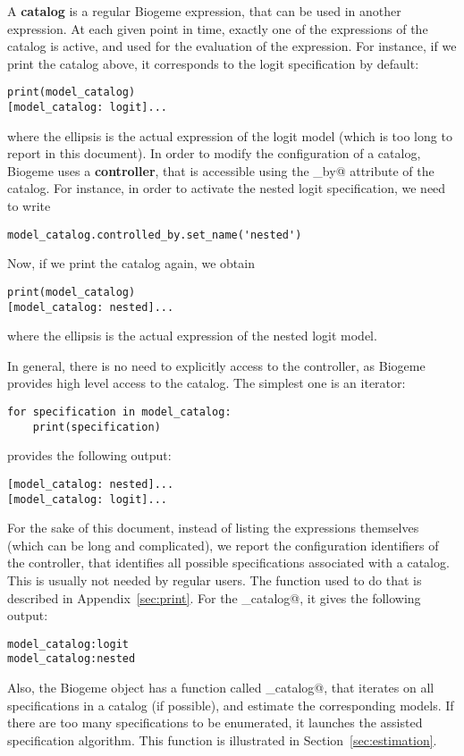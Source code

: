 \documentclass[12pt,a4paper]{article}
\begin{document}
A \textbf{catalog} is a regular Biogeme expression, that can be used
in another expression. At each given point in time, exactly one of the
expressions of the catalog is active, and used for the evaluation of
the expression. For instance, if we print the catalog above, it
corresponds to the logit specification by default:
\begin{lstlisting}
print(model_catalog)
[model_catalog: logit]...
\end{lstlisting}
where the ellipsis is the actual expression of the logit model (which is too long to report in this document). 
In order to modify the configuration of a catalog, Biogeme uses a
\textbf{controller}, that is accessible using the
\lstinline@controlled_by@ attribute of the catalog. For instance, in
order to activate the nested logit specification, we need to write
\begin{lstlisting}
model_catalog.controlled_by.set_name('nested')  
\end{lstlisting}
Now, if we print the catalog again, we obtain
\begin{lstlisting}
print(model_catalog)
[model_catalog: nested]...
\end{lstlisting}
where the ellipsis is the actual expression of the nested logit model. 

In general, there is no need to explicitly access to the controller,
as Biogeme provides high level access to the catalog. The simplest one
is an iterator:
\begin{lstlisting}
for specification in model_catalog:
    print(specification)
\end{lstlisting}
provides the following output:
\begin{lstlisting}
[model_catalog: nested]...
[model_catalog: logit]...
\end{lstlisting}
For the sake of this document, instead of listing the expressions themselves (which can be long and complicated), we report the configuration identifiers of the controller, that identifies all possible specifications associated with a catalog. This is usually not needed by regular users. The function used to do that is described in Appendix~\ref{sec:print}.
For the \lstinline@model_catalog@, it gives the following output:
\begin{lstlisting}
model_catalog:logit
model_catalog:nested
\end{lstlisting}
Also, the Biogeme object has a function called
\lstinline@estimate_catalog@, that iterates on all specifications in a
catalog (if possible), and estimate the corresponding models. If there
are too many specifications to be enumerated, it launches the assisted
specification algorithm. This function is illustrated in
Section~\ref{sec:estimation}.
\end{document}
